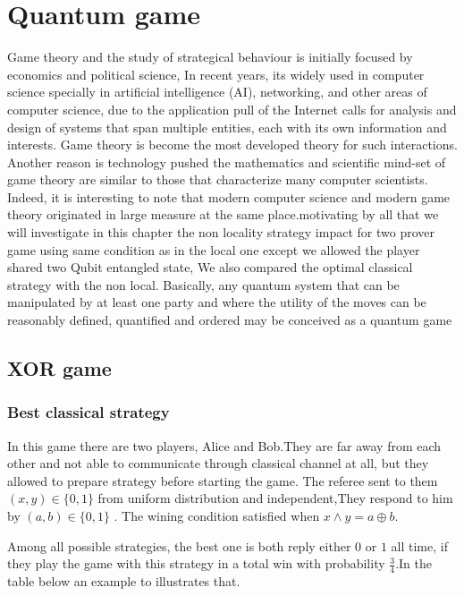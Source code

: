 \chapter{Quantum game}

Game theory  and  the study of strategical behaviour is initially focused by economics and political science, In recent years, its widely used in computer science specially in artificial intelligence (AI), networking, and other areas of computer science, due to  the application pull of the Internet calls for analysis and design of systems that span multiple entities, each with its own information and interests. Game theory is become the most developed theory for such interactions. Another reason is technology pushed the mathematics and scientific mind-set of game theory are similar to those that characterize many computer scientists. Indeed, it is interesting to note that modern computer science and modern game theory originated in large measure at the same place.motivating by all that we will investigate in this chapter  the non locality strategy  impact  for two prover game using same condition as in the local one except we allowed the player shared two Qubit entangled  state, We also compared  the optimal classical strategy with the non local. Basically, any quantum system that can be manipulated by at least one party and where the utility of the moves can be reasonably defined, quantified and ordered may be conceived as a quantum game

\section{XOR game}
\subsection{Best classical strategy}
In this game there are  two players, Alice and Bob.They are far away from each other and not able to communicate through classical channel at all, but they allowed to prepare strategy  before starting the game. The referee sent to them    $(x,y)\in \{0,1\}$  from uniform distribution and independent\citep{PhysRevA.93.022333},They respond  to him by $(a,b)\in \{0,1\}$ .  The   wining  condition  satisfied when $x\wedge y= a\oplus b$.

Among all possible strategies, the best one is both reply either $0$ or $1$ all time, if they play the game with this strategy in a total win with probability $\frac{3}{4}$.In the table below an example to illustrates that.

